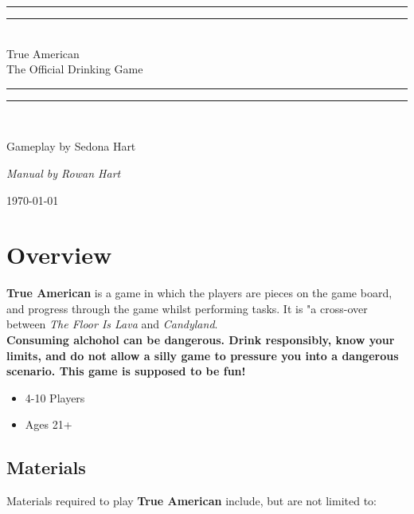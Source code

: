 \documentclass[12pt]{article}
\newlength{\drop}
\begin{document}
\begin{titlepage}
    \textheight
    \centering
    \vspace*{\baselineskip}
    \rule{\textwidth}{1.6pt}\vspace*{-\baselineskip}\vspace*{2pt}
    \rule{\textwidth}{0.4pt}\\[\baselineskip]
    {\LARGE True American \\[0.3\baselineskip] The Official Drinking Game}\\[0.2\baselineskip]
    \rule{\textwidth}{0.4pt}\vspace*{-\baselineskip}\vspace{3.2pt}
    \rule{\textwidth}{1.6pt}\\[\baselineskip]
    \scshape
    \vspace*{2\baselineskip}
    {\Large Gameplay by Sedona Hart\par}
    {\itshape Manual by Rowan Hart\par}
    \vspace*{2\baselineskip}
    {\scshape \today} \\
    \vfill
\end{titlepage}

\section{Overview} \label{overview}

\textbf{True American} is a game in which the players are pieces on the game board, and progress through the game whilst performing tasks. It is "a cross-over between \textit{The Floor Is Lava} and \textit{Candyland}. \\

\textbf{Consuming alchohol can be dangerous. Drink responsibly, know your limits, and do not allow a silly game to pressure you into a dangerous scenario. This game is supposed to be fun!}

\begin{itemize}
\item 4-10 Players
\item Ages 21+
\end{itemize}

\subsection{Materials}

Materials required to play \textbf{True American} include, but are not limited to: \\
\end{document}
